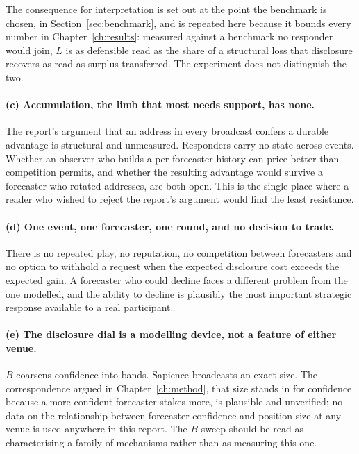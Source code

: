 The consequence for interpretation is set out at the point the benchmark is chosen, in
Section~\ref{sec:benchmark}, and is repeated here because it bounds every number in
Chapter~\ref{ch:results}: measured against a benchmark no responder would join, $L$ is as
defensible read as the share of a structural loss that disclosure recovers as read as
surplus transferred. The experiment does not distinguish the two.

\paragraph{(c) Accumulation, the limb that most needs support, has none.} The report's
argument that an address in every broadcast confers a durable advantage is structural and
unmeasured. Responders carry no state across events. Whether an observer who
builds a per-forecaster history can price better than competition permits, and whether the
resulting advantage would survive a forecaster who rotated addresses, are both open. This is
the single place where a reader who wished to reject the report's argument would find the
least resistance.

\paragraph{(d) One event, one forecaster, one round, and no decision to trade.} There is no
repeated play, no reputation, no competition between forecasters and no option to withhold a
request when the expected disclosure cost exceeds the expected gain. A forecaster who could
decline faces a different problem from the one modelled, and the ability to decline is
plausibly the most important strategic response available to a real participant.

\paragraph{(e) The disclosure dial is a modelling device, not a feature of either venue.}
$B$ coarsens confidence into bands. Sapience broadcasts an exact size. The correspondence
argued in Chapter~\ref{ch:method}, that size stands in for confidence because a more
confident forecaster stakes more, is plausible and unverified; no data on the relationship
between forecaster confidence and position size at any venue is used anywhere in this
report. The $B$ sweep should be read as characterising a family of mechanisms rather than as
measuring this one.

